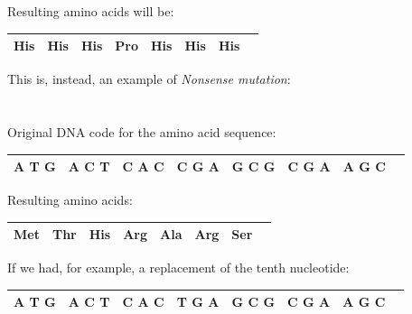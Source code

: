 \vspace{15mm}

Resulting amino acids will be:

\vspace{5mm}

\begin{tabular}{|l|l|l|l|l|l|rl|}
\hline
His         &	His         &	His         &	\textbf{Pro}         &	His         &	His         &	His  	&       \\
\hline
\end{tabular}

\vspace{30mm}

This is, instead, an example of \emph{Nonsense mutation}:
\\
\\
\\Original DNA code for the amino acid sequence:

\vspace{5mm}

\begin{tabular}{|l|l|l|l|l|l|rl|}
\hline
A   T   G         &	A   C   T         &	C   A   C         &	C   G   A         &	G   C   G         &	C   G   A         &	A   G   C  	&       \\
\hline
\end{tabular}

\vspace{15mm}

Resulting amino acids:

\vspace{5mm}

\begin{tabular}{|l|l|l|l|l|l|rl|}
\hline
Met         &	Thr         &	His         &	Arg         &	Ala         &	Arg         &	Ser  	&       \\
\hline
\end{tabular}

\vspace{25mm}

If we had, for example, a replacement of the tenth nucleotide:

\vspace{5mm}

\begin{tabular}{|l|l|l|l|l|l|rl|}
\hline
A   T   G         &	A   C   T         &	C   A   C         &	\textbf{T}   G   A         &	G   C   G         &	C   G   A         &	A   G   C  	&       \\
\hline
\end{tabular}


